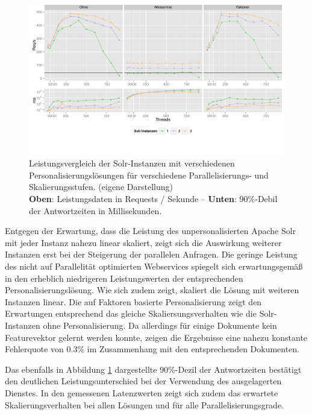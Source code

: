 \begin{figure}[htb]
  \centering
    \includegraphics[width=\textwidth]{Abbildungen/personalisierung.pdf}
    \caption[Leistung d. personalisierten Suche]{Leistungsvergleich der Solr-Instanzen mit verschiedenen Personalisierungslösungen für verschiedene Parallelisierungs- und Skalierungsstufen.  {\scriptsize (eigene Darstellung)} \\ { \footnotesize \textbf{Oben}: Leistungsdaten in Requests / Sekunde -- \textbf{Unten}: 90\%-Debil der Antwortzeiten in Millisekunden.}} 
    \label{fig:chart_solr}
\end{figure}

Entgegen der Erwartung, dass die Leistung des unpersonalisierten Apache Solr mit jeder Instanz nahezu linear skaliert, zeigt sich die Auswirkung weiterer Instanzen erst bei der Steigerung der parallelen Anfragen.  Die geringe Leistung des nicht auf Parallelität optimierten Webservices spiegelt sich erwartungsgemäß in den erheblich niedrigeren Leistungswerten der entsprechenden Personalisierungslösung. Wie sich zudem zeigt, skaliert die Lösung mit weiteren Instanzen linear. Die auf Faktoren basierte Personalisierung zeigt den Erwartungen entsprechend das gleiche Skaliersungsverhalten wie die Solr-Instanzen ohne Personalisierung. Da allerdings für einige Dokumente kein Featurevektor gelernt werden konnte, zeigen die Ergebnisse eine nahezu konstante Fehlerquote von 0.3\% im Zusammenhang mit den entsprechenden Dokumenten.

Das ebenfalls in Abbildung \ref{fig:chart_solr} dargestellte 90\%-Dezil der Antwortzeiten bestätigt den deutlichen Leistungsunterschied bei der Verwendung des ausgelagerten Dienstes. 
In den gemessenen Latenzwerten zeigt sich zudem das erwartete Skalierungsverhalten bei allen Lösungen und für alle Parallelisierungsgrade.

